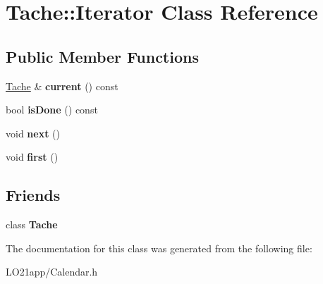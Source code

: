 \hypertarget{class_tache_1_1_iterator}{}\section{Tache\+:\+:Iterator Class Reference}
\label{class_tache_1_1_iterator}
\subsection*{Public Member Functions}
\begin{DoxyCompactItemize}
\item 
\hypertarget{class_tache_1_1_iterator_a14d6234f2a8ea2c4e87687375272123a}{}\hyperlink{class_tache}{Tache} \& {\bfseries current} () const \label{class_tache_1_1_iterator_a14d6234f2a8ea2c4e87687375272123a}

\item 
\hypertarget{class_tache_1_1_iterator_a8130c3fa6c6cd3c9e2489162e3a01e56}{}bool {\bfseries is\+Done} () const \label{class_tache_1_1_iterator_a8130c3fa6c6cd3c9e2489162e3a01e56}

\item 
\hypertarget{class_tache_1_1_iterator_ae9d3e979ec79eb49a73be93391d171a0}{}void {\bfseries next} ()\label{class_tache_1_1_iterator_ae9d3e979ec79eb49a73be93391d171a0}

\item 
\hypertarget{class_tache_1_1_iterator_a7329120b9efd311ef5ab48a42c997be8}{}void {\bfseries first} ()\label{class_tache_1_1_iterator_a7329120b9efd311ef5ab48a42c997be8}

\end{DoxyCompactItemize}
\subsection*{Friends}
\begin{DoxyCompactItemize}
\item 
\hypertarget{class_tache_1_1_iterator_affcde2942f74e98f2e6e352cba2a1dc1}{}class {\bfseries Tache}\label{class_tache_1_1_iterator_affcde2942f74e98f2e6e352cba2a1dc1}

\end{DoxyCompactItemize}


The documentation for this class was generated from the following file\+:\begin{DoxyCompactItemize}
\item 
L\+O21app/Calendar.\+h\end{DoxyCompactItemize}
